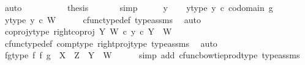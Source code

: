 \begin{isabellebody}
\ auto\isanewline
\ \ \ \isamarkupfalse%
\isanewline
\ \ \ \isamarkupfalse%
\ \isamarkupfalse%
\ {\isacharquery}{\kern0pt}thesis\isanewline
\ \ \ \ \ \isamarkupfalse%
\ simp\isanewline
\ \isamarkupfalse%
\isanewline
{}\isamarkupfalse%
\isanewline
\ \ \isamarkupfalse%
\ y\isanewline
\ \ \isamarkupfalse%
\ y{\isacharunderscore}{\kern0pt}type{\isacharcolon}{\kern0pt}\ {\isachardoublequoteopen}y\ {\isasymin}\isactrlsub c\ codomain\ g{\isachardoublequoteclose}\isanewline
\ \ \isamarkupfalse%
\ \isamarkupfalse%
\ y{\isacharunderscore}{\kern0pt}type{}{\isacharcolon}{\kern0pt}\ {\isachardoublequoteopen}y\ {\isasymin}\isactrlsub c\ W{\isachardoublequoteclose}\isanewline
\ \ \ \ \isamarkupfalse%
\ cfunc{\isacharunderscore}{\kern0pt}type{\isacharunderscore}{\kern0pt}def\ type{\isacharunderscore}{\kern0pt}assms{\isacharparenleft}{\kern0pt}{}{\isacharparenright}{\kern0pt}\ \isamarkupfalse%
\ auto\ \isanewline
\ \ \isamarkupfalse%
\ \isamarkupfalse%
\ coproj{\isacharunderscore}{\kern0pt}y{\isacharunderscore}{\kern0pt}type{\isacharcolon}{\kern0pt}\ {\isachardoublequoteopen}{\isacharparenleft}{\kern0pt}right{\isacharunderscore}{\kern0pt}coproj\ Y\ W{\isacharparenright}{\kern0pt}\ {\isasymcirc}\isactrlsub c\ y\ {\isasymin}\isactrlsub c\ {\isacharparenleft}{\kern0pt}Y\ {\isasymCoprod}\ W{\isacharparenright}{\kern0pt}{\isachardoublequoteclose}\ \isanewline
\ \ \ \ \isamarkupfalse%
\ cfunc{\isacharunderscore}{\kern0pt}type{\isacharunderscore}{\kern0pt}def\ comp{\isacharunderscore}{\kern0pt}type\ right{\isacharunderscore}{\kern0pt}proj{\isacharunderscore}{\kern0pt}type\ type{\isacharunderscore}{\kern0pt}assms{\isacharparenleft}{\kern0pt}{}{\isacharparenright}{\kern0pt}\ \isamarkupfalse%
\ auto\isanewline
\ \ \isamarkupfalse%
\ fg{\isacharunderscore}{\kern0pt}type{\isacharcolon}{\kern0pt}\ {\isachardoublequoteopen}{\isacharparenleft}{\kern0pt}f\ {\isasymbowtie}\isactrlsub f\ g{\isacharparenright}{\kern0pt}\ {\isacharcolon}{\kern0pt}\ X\ {\isasymCoprod}\ Z\ {\isasymrightarrow}\ Y\ {\isasymCoprod}\ W{\isachardoublequoteclose}\isanewline
\ \ \ \ \isamarkupfalse%
\ {\isacharparenleft}{\kern0pt}simp\ add{\isacharcolon}{\kern0pt}\ cfunc{\isacharunderscore}{\kern0pt}bowtie{\isacharunderscore}{\kern0pt}prod{\isacharunderscore}{\kern0pt}type\ type{\isacharunderscore}{\kern0pt}assms{\isacharparenright}{\kern0pt}\isanewline

\end{isabellebody}

